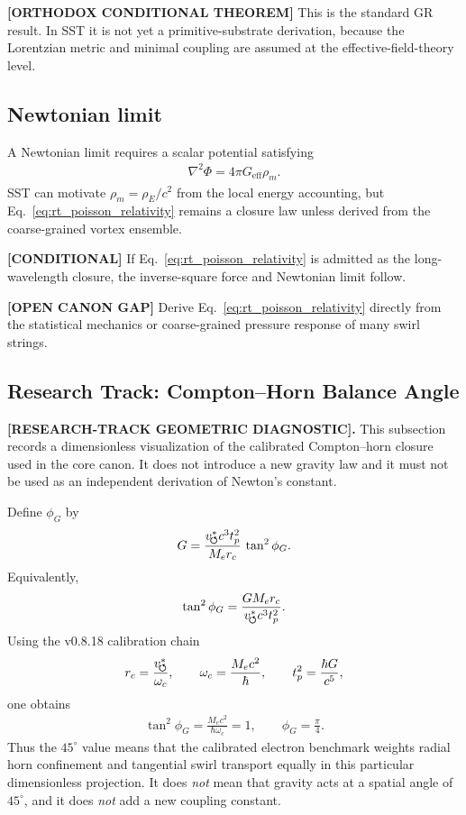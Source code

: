 \textbf{[ORTHODOX CONDITIONAL THEOREM]} This is the standard GR result. In SST
it is not yet a primitive-substrate derivation, because the Lorentzian metric
and minimal coupling are assumed at the effective-field-theory level.

\subsection{Newtonian limit}

A Newtonian limit requires a scalar potential satisfying
\begin{align}
    \nabla^2 \Phi
    =
    4\pi G_{\mathrm{eff}}\rho_{\!m}.
    \label{eq:rt_poisson_relativity}
\end{align}
SST can motivate \(\rho_{\!m}=\rho_{\!E}/c^2\) from the local energy accounting,
but Eq.~\eqref{eq:rt_poisson_relativity} remains a closure law unless derived from the
coarse-grained vortex ensemble.

\textbf{[CONDITIONAL]} If Eq.~\eqref{eq:rt_poisson_relativity} is admitted as the
long-wavelength closure, the inverse-square force and Newtonian limit follow.

\textbf{[OPEN CANON GAP]} Derive Eq.~\eqref{eq:rt_poisson_relativity} directly from the
statistical mechanics or coarse-grained pressure response of many swirl strings.

\subsection{Research Track: Compton--Horn Balance Angle}
\label{sec:rt_compton_horn_balance_angle}

\textbf{[RESEARCH-TRACK GEOMETRIC DIAGNOSTIC].}
This subsection records a dimensionless visualization of the calibrated
Compton--horn closure used in the core canon.  It does not introduce a new
gravity law and it must not be used as an independent derivation of
Newton's constant.

Define \(\phi_G\) by
\begin{align}
    G
    =
    \frac{v_{\!\boldsymbol{\circlearrowleft}}^{\ast} c^3t_p^2}{M_er_c}\,\tan^2\phi_G .
    \label{eq:rt_balance_angle_definition}
\end{align}
Equivalently,
\begin{align}
    \tan^2\phi_G
    =
    \frac{GM_er_c}{v_{\!\boldsymbol{\circlearrowleft}}^{\ast} c^3t_p^2}.
    \label{eq:rt_balance_angle_value}
\end{align}
Using the v0.8.18 calibration chain
\begin{align}
    r_c=\frac{v_{\!\boldsymbol{\circlearrowleft}}^{\ast}}{\omega_c},
    \qquad
    \omega_c=\frac{M_ec^2}{\hbar},
    \qquad
    t_p^2=\frac{\hbar G}{c^5},
\end{align}
one obtains
\begin{align}
    \tan^2\phi_G
    =
    \frac{M_ec^2}{\hbar\omega_c}
    =1,
    \qquad
    \phi_G=\frac{\pi}{4}.
    \label{eq:rt_balance_angle_pi_over_four}
\end{align}
Thus the \(45^\circ\) value means that the calibrated electron benchmark
weights radial horn confinement and tangential swirl transport equally in this
particular dimensionless projection.  It does \emph{not} mean that gravity acts
at a spatial angle of \(45^\circ\), and it does \emph{not} add a new coupling
constant.

